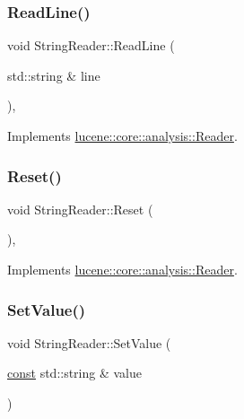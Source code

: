 \subsubsection{\texorpdfstring{Read\+Line()}{ReadLine()}}
{\footnotesize\ttfamily void String\+Reader\+::\+Read\+Line (\begin{DoxyParamCaption}\item[{std\+::string \&}]{line }\end{DoxyParamCaption})\hspace{0.3cm}{\ttfamily [override]}, {\ttfamily [virtual]}}



Implements \mbox{\hyperlink{classlucene_1_1core_1_1analysis_1_1Reader_a475ba046fd74e43a1cce4c4702c791c2}{lucene\+::core\+::analysis\+::\+Reader}}.

\mbox{\label{classlucene_1_1core_1_1analysis_1_1StringReader_ab68ad2d8d2e375cd063c374c570fcffa}} 
\subsubsection{\texorpdfstring{Reset()}{Reset()}}
{\footnotesize\ttfamily void String\+Reader\+::\+Reset (\begin{DoxyParamCaption}{ }\end{DoxyParamCaption})\hspace{0.3cm}{\ttfamily [override]}, {\ttfamily [virtual]}}



Implements \mbox{\hyperlink{classlucene_1_1core_1_1analysis_1_1Reader_a5299f5469ce4ea9812ec79a59667945a}{lucene\+::core\+::analysis\+::\+Reader}}.

\mbox{\label{classlucene_1_1core_1_1analysis_1_1StringReader_a2f707cdd271256c3cdf6e0004822612e}} 
\subsubsection{\texorpdfstring{Set\+Value()}{SetValue()}\hspace{0.1cm}{\footnotesize\ttfamily [1/4]}}
{\footnotesize\ttfamily void String\+Reader\+::\+Set\+Value (\begin{DoxyParamCaption}\item[{\mbox{\hyperlink{ZlibCrc32_8h_a2c212835823e3c54a8ab6d95c652660e}{const}} std\+::string \&}]{value }\end{DoxyParamCaption})}

